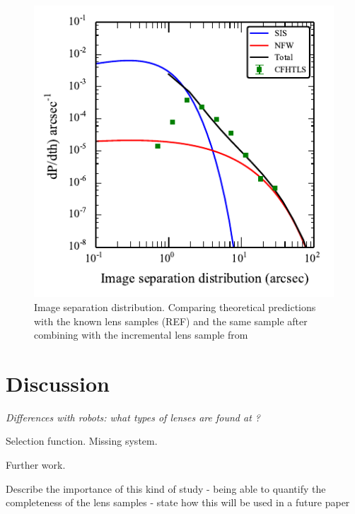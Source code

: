\documentclass[useAMS,usenatbib,a4paper]{mn2e}
\begin{document}
\begin{figure}
\begin{center}
\includegraphics[scale=1.0]{sw-cfhtls-figs/isd_cfhtls_sw.pdf}
\caption{ \label{fig:isd} Image separation distribution. Comparing
theoretical predictions with the \cfhtls known lens samples (REF) and
the same \cfhtls sample after combining with the incremental lens sample
from \sw }
\end{center}
\end{figure}



\section{Discussion}
\label{sec:discuss}

{\it Differences with robots: what types of lenses are found at \sw?

Selection function. Missing system.

Further work.

Describe the importance of this kind of study 
- being able to quantify the completeness of the lens samples
- state how this will be used in a future \sw paper }
\end{document}
